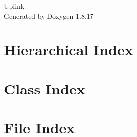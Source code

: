 \let\mypdfximage\pdfximage\def\pdfximage{\immediate\mypdfximage}\documentclass[twoside]{book}
\newcommand{\+}{\discretionary{\mbox{\scriptsize$\hookleftarrow$}}{}{}}
\newcommand{\clearemptydoublepage}{%
  \newpage{\pagestyle{empty}\cleardoublepage}%
}
\begin{document}
\hypersetup{pageanchor=false,
             bookmarksnumbered=true,
             pdfencoding=unicode
            }
\begin{titlepage}
\vspace*{7cm}
\begin{center}%
{\Large Uplink }\\
\vspace*{1cm}
{\large Generated by Doxygen 1.8.17}\\
\end{center}
\end{titlepage}
\clearemptydoublepage
{}
\tableofcontents
\clearemptydoublepage
{}
\hypersetup{pageanchor=true}

\chapter{Hierarchical Index}

\chapter{Class Index}

\chapter{File Index}

\end{document}
